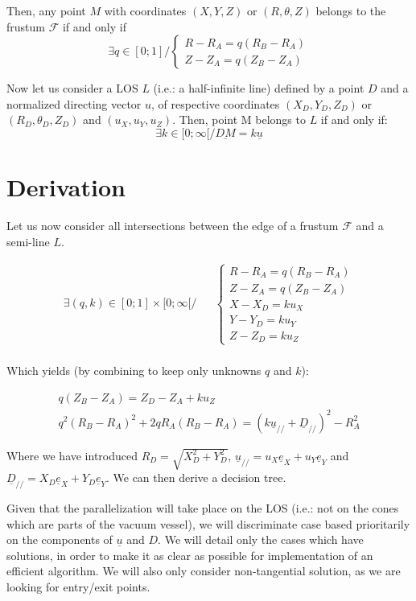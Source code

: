 \documentclass[a4paper,11pt,twoside,titlepage,openright]{book}
\numberwithin{equation}{section}
\newcommand{\ud}[1]{\underline{#1}}
\begin{document}
Then, any point $M$ with coordinates $(X,Y,Z)$ or $(R,\theta,Z)$ belongs to the frustum $\mathcal{F}$ if and only if
$$
\exists q \in [0;1] /
\left\{ \begin{array}{ll}
R-R_A = q(R_B-R_A)\\
Z-Z_A = q(Z_B-Z_A)
\end{array}\right.
$$


Now let us consider a LOS $L$ (i.e.: a half-infinite line) defined by a point $D$ and a normalized directing vector $u$, of respective coordinates $(X_D,Y_D,Z_D)$ or $(R_D,\theta_D,Z_D)$ and $(u_X,u_Y,u_Z)$.
Then, point M belongs to $L$ if and only if:
$$
\exists k \in [0;\infty[ / \ud{DM} = k\ud{u}
$$


\chapter{Derivation}

Let us now consider all intersections between the edge of a frustum $\mathcal{F}$ and a semi-line $L$.

\begin{equation}
\begin{array}{lll}
\exists (q,k) \in [0;1]\times [0;\infty[ /& &
\left\{\begin{array}{ll}
R-R_A = q(R_B-R_A)\\
Z-Z_A = q(Z_B-Z_A)\\
X-X_D = ku_X\\
Y-Y_D = ku_Y\\
Z-Z_D = ku_Z
\end{array}\right.\\
\end{array}
\label{eqn:201}
\end{equation}

Which yields (by combining to keep only unknowns $q$ and $k$):

\begin{equation}
\begin{array}{cc}
q(Z_B-Z_A) = Z_D-Z_A + ku_Z\\
q^2(R_B-R_A)^2 + 2qR_A(R_B-R_A) = \left(k\ud{u}_{//} + \ud{D}_{//}\right)^2 - R_A^2
\end{array}
\end{equation}

Where we have introduced $R_D = \sqrt{X_D^2+Y_D^2}$, $\ud{u}_{//} = u_X\ud{e}_X+u_Y\ud{e}_Y$ and $\ud{D}_{//} = X_D\ud{e}_X + Y_D\ud{e}_Y$.
We can then derive a decision tree.


Given that the parallelization will take place on the LOS (i.e.: not on the cones which are parts of the vacuum vessel), we will discriminate case based prioritarily on the components of $\ud{u}$ and $D$.
We will detail only the cases which have solutions, in order to make it as clear as possible for implementation of an efficient algorithm.
We will also only consider non-tangential solution, as we are looking for entry/exit points.
\end{document}
